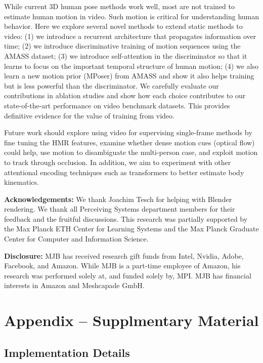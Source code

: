 \documentclass[10pt,twocolumn,letterpaper]{article}
\begin{document}
While current 3D human pose methods work well, most are not trained to estimate human motion in video.
Such motion is critical for understanding human behavior.
Here we explore several novel methods to extend static methods to video: 
(1) we introduce a recurrent architecture that propagates information over time;
(2) we introduce discriminative training of motion sequences using the AMASS dataset;
(3) we introduce self-attention in the discriminator so that it learns to focus on the important temporal structure of human motion;
(4) we also learn a new motion prior (MPoser) from AMASS and show it also helps training but is less powerful than the discriminator.
We carefully evaluate our contributions in ablation studies and show how each choice contributes to our state-of-the-art performance on video benchmark datasets.
This provides definitive evidence for the value of training from video.

Future work should explore using video for supervising single-frame methods by fine tuning the HMR features, examine whether dense motion cues (optical flow) could help, use motion to disambiguate the multi-person case, and exploit motion to track through occlusion. In addition, we aim to experiment with other attentional encoding techniques such as transformers to better estimate body kinematics.

 \small{\noindent
{\bf Acknowledgements:} 
We thank Joachim Tesch for helping with Blender rendering. We thank all Perceiving Systems department members for their feedback and the fruitful discussions. This research was partially supported by the Max Planck ETH Center for Learning Systems and the Max Planck Graduate Center for Computer and Information Science.

\noindent
{\bf Disclosure:} 
MJB has received research gift funds from Intel, Nvidia, Adobe, Facebook, and Amazon. 
While MJB is a part-time employee of Amazon, his research was performed solely at, and funded solely by, MPI. 
MJB has financial interests in Amazon and Meshcapade GmbH.} 
{\small


}

\newpage

\section{Appendix -- Supplmentary Material}

\subsection{Implementation Details}
\end{document}
